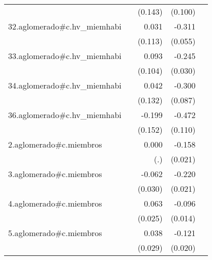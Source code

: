 {\begin{longtable}{l*{4}{D{.}{.}{-1}}}
            &                     &     (0.143)         &     (0.100)         &                     \\
\addlinespace
32.aglomerado#c.hv\_miemhabi&                     &       0.031         &      -0.311\sym{***}&                     \\
            &                     &     (0.113)         &     (0.055)         &                     \\
\addlinespace
33.aglomerado#c.hv\_miemhabi&                     &       0.093         &      -0.245\sym{***}&                     \\
            &                     &     (0.104)         &     (0.030)         &                     \\
\addlinespace
34.aglomerado#c.hv\_miemhabi&                     &       0.042         &      -0.300\sym{***}&                     \\
            &                     &     (0.132)         &     (0.087)         &                     \\
\addlinespace
36.aglomerado#c.hv\_miemhabi&                     &      -0.199         &      -0.472\sym{***}&                     \\
            &                     &     (0.152)         &     (0.110)         &                     \\
\addlinespace
2.aglomerado#c.miembros&                     &       0.000         &      -0.158\sym{***}&                     \\
            &                     &         (.)         &     (0.021)         &                     \\
\addlinespace
3.aglomerado#c.miembros&                     &      -0.062\sym{*}  &      -0.220\sym{***}&                     \\
            &                     &     (0.030)         &     (0.021)         &                     \\
\addlinespace
4.aglomerado#c.miembros&                     &       0.063\sym{*}  &      -0.096\sym{***}&                     \\
            &                     &     (0.025)         &     (0.014)         &                     \\
\addlinespace
5.aglomerado#c.miembros&                     &       0.038         &      -0.121\sym{***}&                     \\
            &                     &     (0.029)         &     (0.020)         &                     \\

\end{longtable}}
